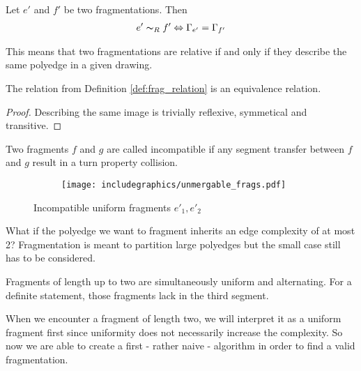 \begin{definition}
	Let $e'$ and $f'$ be two fragmentations. Then 
	\begin{align*}e' \thicksim_R f' \Leftrightarrow \Gamma_{e'} = \Gamma_{f'}
	\end{align*}\label{def:frag_relation}
\end{definition}
This means that two fragmentations are relative if and only if they describe the same polyedge in a given drawing.
\begin{lemma}
	The relation from Definition \ref{def:frag_relation} is an equivalence relation.
\end{lemma}
\begin{proof}
	Describing the same image is trivially reflexive, symmetical and transitive.
\end{proof}
\begin{definition}
	Two fragments $f$ and $g$ are called incompatible if any segment transfer between $f$ and $g$ result in a turn property collision.
\end{definition}
\begin{figure}[h]
	\centering
	\begin{subfigure}{0.4\textwidth}
		\centering
		\texttt{[image: includegraphics/unmergable\_frags.pdf]}
	\end{subfigure}
	\caption{Incompatible uniform fragments $e'_1,e'_2$}\label{im:incompatible}
\end{figure}
What if the polyedge we want to fragment inherits an edge complexity of at most 2? Fragmentation is meant to partition large polyedges but the small case still has to be considered. 
\begin{lemma}
	Fragments of length up to two are simultaneously uniform and alternating. For a definite statement, those fragments lack in the third segment.\label{lem:2-frag}
\end{lemma}
When we encounter a fragment of length two, we will interpret it as a uniform fragment first since uniformity does not necessarily increase the complexity. So now we are able to create a first - rather naive - algorithm in order to find a valid fragmentation.\newpage
